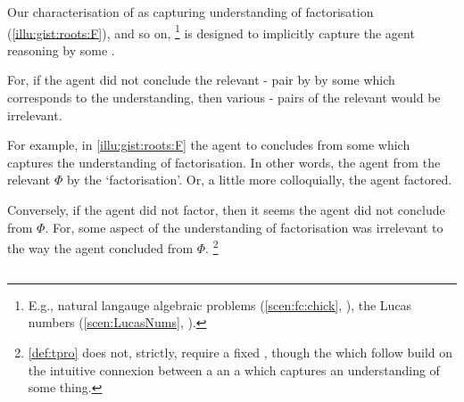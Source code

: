 \begin{note}
  Our characterisation of  as capturing understanding of factorisation (\autoref{illu:gist:roots:F}), and so on,%
  \footnote{
    E.g., natural langauge algebraic problems (\autoref{scen:fc:chick}, ), the Lucas numbers (\autoref{scen:LucasNums}, ).
  }
  is designed to implicitly capture the agent reasoning by some \torNa{}.

  For, if the agent did not conclude the relevant - pair by \tCV{} by some \torNa{} which corresponds to the \agents{} understanding, then various - pairs of the relevant \pool{} would be irrelevant.

  For example, in \autoref{illu:gist:roots:F} the agent to concludes  from some \pool{} which captures the \agents{} understanding of factorisation.
  In other words, the agent \tCV[concluded]{}  from the relevant \pool{} \(\Phi\) by the \torNa{} `factorisation'.
  Or, a little more colloquially, the agent factored.

  Conversely, if the agent did not factor, then it seems the agent did not conclude  from \(\Phi\).
  For, some aspect of the \agents{} understanding of factorisation was irrelevant to the way the agent concluded  from \(\Phi\).%
  \footnote{
    \autoref{def:tpro} does not, strictly, require a fixed \pool{}, though the  which follow build on the intuitive connexion between a \torN{} an a \pool{} which captures an \agents{} understanding of some thing.
  }
\end{note}



\subsection{}
\label{sec:tpros}



